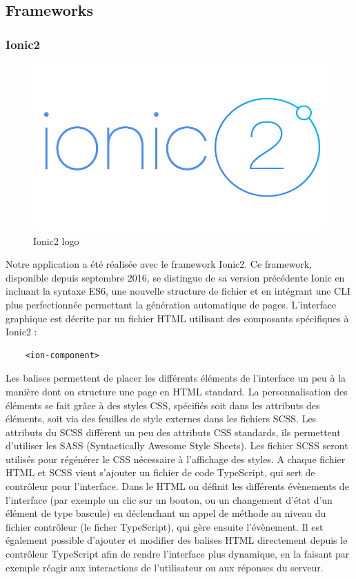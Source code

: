 \documentclass[french]{article}
\begin{document}
	\subsection{Frameworks}
	
	\subsubsection{Ionic2}
	
	\begin{figure}[H]
		\centering
		\includegraphics[scale=0.45]{../images/ionic2-logo.png}
		\caption{Ionic2 logo}
		\label{Ionic2 logo}
	\end{figure} 
	
	Notre application a été réalisée avec le framework Ionic2. Ce framework, disponible depuis septembre 2016, se distingue de sa version précédente Ionic en incluant la syntaxe ES6, une nouvelle structure de fichier et en intégrant une CLI plus perfectionnée permettant la génération automatique de pages.
	L’interface graphique est décrite par un fichier HTML utilisant des composants spécifiques à Ionic2 :
	
	\lstset{language = HTML5}
	\begin{lstlisting}
	<ion-component>
	\end{lstlisting}
	
	Les balises permettent de placer les différents éléments de l’interface un peu à la manière dont on structure une page en HTML standard. La personnalisation des éléments se fait grâce à des styles CSS, spécifiés soit dans les attributs des éléments, soit via des feuilles de style externes dans les fichiers SCSS. Les attributs du SCSS diffèrent un peu des attributs CSS standards, ils permettent d'utiliser les SASS (Syntactically Awesome Style Sheets). Les fichier SCSS seront utilisés pour régénérer le CSS nécessaire à l'affichage des styles. 
	A chaque fichier HTML et SCSS vient s’ajouter un fichier de code TypeScript, qui sert de contrôleur pour l’interface. Dans le HTML on définit les différents évènements de l’interface (par exemple un clic sur un bouton, ou un changement d'état d'un élément de type bascule) en déclenchant un appel de méthode au niveau du fichier contrôleur (le ficher TypeScript), qui gère ensuite l’évènement. Il est également possible d’ajouter et modifier des balises HTML directement depuis le contrôleur TypeScript afin de rendre l’interface plus dynamique, en la faisant par exemple réagir aux interactions de l’utilisateur ou aux réponses du serveur. 
	
\end{document}
